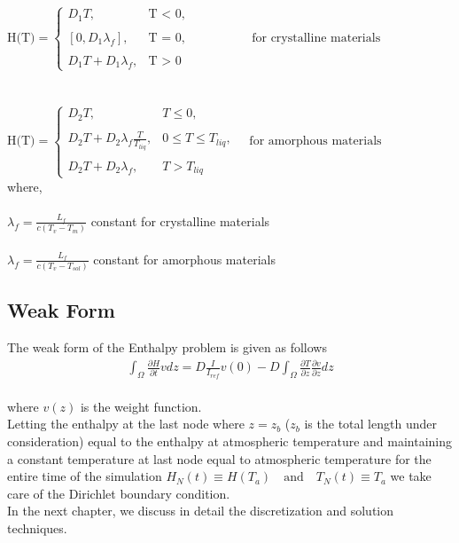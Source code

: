 $\text{H(T)} =
\begin{cases}
D_1 T, & \text{T < 0}, \\ \\
[0, D_1 \lambda_f], & \text{T = 0}, \\ \\
D_1 T + D_1\lambda_f, & \text{T > 0}
\end{cases}\quad\quad\quad\quad\quad\text{for crystalline materials} \label{eq:slope}$ \\
\\
\\
$\text{H(T)} =
\begin{cases}
D_2 T, & T \leq 0, \\ \\
D_2 T+ D_2 \lambda_f \frac{T}{T_{liq}}, & 0 \leq T \leq T_{liq}, \\ \\
D_2 T + D_2\lambda_f, & T > T_{liq}
\end{cases}\quad\text{for amorphous materials}$\\

\noindent where,\\\\
\indent $\lambda_f = \frac{L_f}{c(T_v - T_m)}$ constant for crystalline materials\\\\
\indent $\lambda_f = \frac{L_f}{c(T_v - T_{sol})}$ constant  for amorphous materials\\
\subsection{Weak Form}
The weak form of the Enthalpy problem is given as follows\\
\begin{subequations}
\begin{align}
\int_{\Omega}\frac{\partial{H}}{\partial{t}}vdz = D\frac{I}{I_{ref}}v(0) - D\int_{\Omega}\frac{\partial{T}}{\partial{z}}\frac{\partial{{v}}}{\partial{z}}dz \label{eq:Entalpyvarform}
\end{align}
\end{subequations}\\
where $v(z)$ is the weight function.\\

Letting the enthalpy at the last node where $z = z_b$ ($z_b$ is the total length under consideration) equal to the enthalpy at atmospheric temperature and maintaining a constant temperature at last node equal to atmospheric temperature for the entire time of the simulation $H_N(t) \equiv H(T_a) \quad\text{and}\quad T_N(t) \equiv T_a$ we take care of the Dirichlet boundary condition.\\ In the next chapter, we discuss in detail the discretization and solution techniques.\\ 